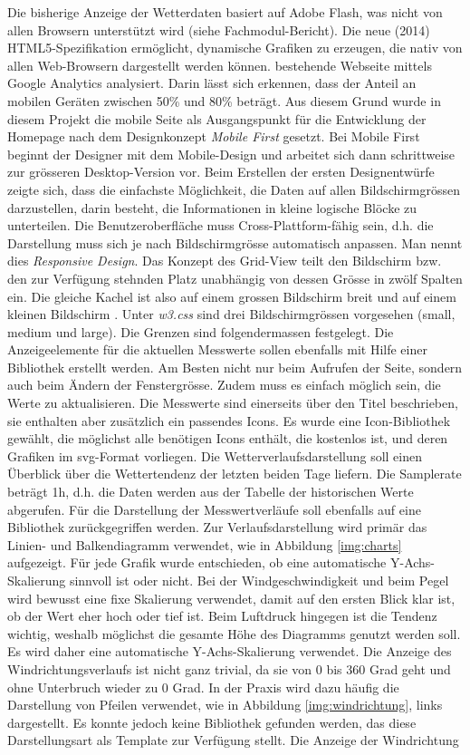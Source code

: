 \documentclass[11pt]{article}
\begin{document}
\begin{multicols}{2}
Die bisherige Anzeige der Wetterdaten basiert auf Adobe Flash, was nicht von allen Browsern unterstützt wird (siehe Fachmodul-Bericht). Die neue (2014) HTML5-Spezifikation ermöglicht, dynamische Grafiken zu erzeugen, die nativ von allen Web-Browsern dargestellt werden können. bestehende Webseite mittels Google Analytics analysiert. Darin lässt sich erkennen, dass der Anteil an mobilen Geräten zwischen 50\% und 80\% beträgt. Aus diesem Grund wurde in diesem Projekt die mobile Seite als Ausgangspunkt für die Entwicklung der Homepage nach dem Designkonzept \textit{Mobile First} gesetzt. Bei Mobile First beginnt der Designer mit dem Mobile-Design und arbeitet sich dann schrittweise zur grösseren Desktop-Version vor. Beim Erstellen der ersten Designentwürfe  zeigte sich, dass die einfachste Möglichkeit, die Daten auf allen Bildschirmgrössen darzustellen, darin besteht, die Informationen in kleine logische Blöcke zu unterteilen. Die Benutzeroberfläche muss Cross-Plattform-fähig sein, d.h. die Darstellung muss sich je nach Bildschirmgrösse automatisch anpassen. Man nennt dies \textit{Responsive Design}. Das Konzept des Grid-View teilt den Bildschirm bzw. den zur Verfügung stehnden Platz unabhängig von dessen Grösse in zwölf Spalten ein. Die gleiche Kachel ist also auf einem grossen Bildschirm   breit und auf einem kleinen Bildschirm . Unter \emph{w3.css} sind drei Bildschirmgrössen vorgesehen (small, medium und large). Die Grenzen sind folgendermassen festgelegt. Die Anzeigeelemente für die aktuellen Messwerte sollen ebenfalls mit Hilfe einer Bibliothek erstellt werden. Am Besten nicht nur beim Aufrufen der Seite, sondern auch beim Ändern der Fenstergrösse. Zudem muss es einfach möglich sein, die Werte zu aktualisieren. Die Messwerte sind einerseits über den Titel beschrieben, sie enthalten aber zusätzlich ein passendes Icons. Es wurde eine Icon-Bibliothek gewählt, die möglichst alle benötigen Icons enthält, die kostenlos ist, und deren Grafiken im svg-Format vorliegen. Die Wetterverlaufsdarstellung soll einen Überblick über die Wettertendenz der letzten beiden Tage liefern. Die Samplerate beträgt 1h, d.h. die Daten werden aus der Tabelle der historischen Werte abgerufen. Für die Darstellung der Messwertverläufe soll ebenfalls auf eine Bibliothek zurückgegriffen werden. Zur Verlaufsdarstellung wird primär das Linien- und Balkendiagramm verwendet, wie in Abbildung \ref{img:charts} aufgezeigt. Für jede Grafik wurde entschieden, ob eine automatische Y-Achs-Skalierung sinnvoll ist oder nicht. Bei der Windgeschwindigkeit und beim Pegel wird bewusst eine fixe Skalierung verwendet, damit auf den ersten Blick klar ist, ob der Wert eher hoch oder tief ist. Beim Luftdruck hingegen ist die Tendenz wichtig, weshalb möglichst die gesamte Höhe des Diagramms genutzt werden soll. Es wird daher eine automatische Y-Achs-Skalierung verwendet. Die Anzeige des Windrichtungsverlaufs ist nicht ganz trivial, da sie von 0 bis 360 Grad geht und ohne Unterbruch wieder zu 0 Grad. In der Praxis wird dazu häufig die Darstellung von Pfeilen verwendet, wie in Abbildung \ref{img:windrichtung}, links dargestellt. Es konnte jedoch keine Bibliothek gefunden werden, das diese Darstellungsart als Template zur Verfügung stellt. Die Anzeige der Windrichtung 
\end{multicols}
\end{document}

